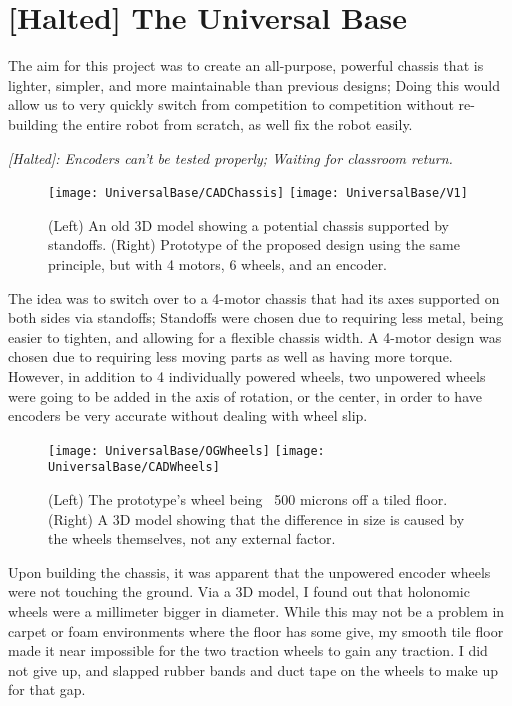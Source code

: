 \section{[Halted] The Universal Base}

The aim for this project was to create an all-purpose, powerful chassis that is lighter, simpler, and more maintainable than previous designs; Doing this would allow us to very quickly switch from competition to competition without re-building the entire robot from scratch, as well fix the robot easily.

\textit{[Halted]: Encoders can't be tested properly; Waiting for classroom return.}

\begin{figure}[h]
    \centering
    \texttt{[image: UniversalBase/CADChassis]}
    \texttt{[image: UniversalBase/V1]}
    \caption{
        (Left) An old 3D model showing a potential chassis supported by standoffs. (Right) Prototype of the proposed design using the same principle, but with 4 motors, 6 wheels, and an encoder.
    }
\end{figure}

The idea was to switch over to a 4-motor chassis that had its axes supported on both sides via standoffs; Standoffs were chosen due to requiring less metal, being easier to tighten, and allowing for a flexible chassis width. A 4-motor design was chosen due to requiring less moving parts as well as having more torque. However, in addition to 4 individually powered wheels, two unpowered wheels were going to be added in the axis of rotation, or the center, in order to have encoders be very accurate without dealing with wheel slip.

\begin{figure}[h]
    \centering
    \texttt{[image: UniversalBase/OGWheels]}
    \texttt{[image: UniversalBase/CADWheels]}
    \caption{
        (Left) The prototype's wheel being ~500 microns off a tiled floor. (Right) A 3D model showing that the difference in size is caused by the wheels themselves, not any external factor.
    }
\end{figure}

Upon building the chassis, it was apparent that the unpowered encoder wheels were not touching the ground. Via a 3D model, I found out that holonomic wheels were a millimeter bigger in diameter. While this may not be a problem in carpet or foam environments where the floor has some give, my smooth tile floor made it near impossible for the two traction wheels to gain any traction. I did not give up, and slapped rubber bands and duct tape on the wheels to make up for that gap.

